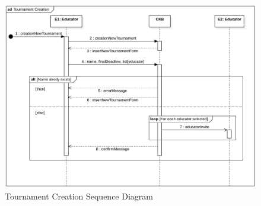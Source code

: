 \begin{figure}[h]
    \centering
    \includegraphics[scale=0.55]{images/SD/TournamentCreationSD.png}
    \caption{Tournament Creation Sequence Diagram}
    \label{fig_TournamentCreationSD}
\end{figure}



